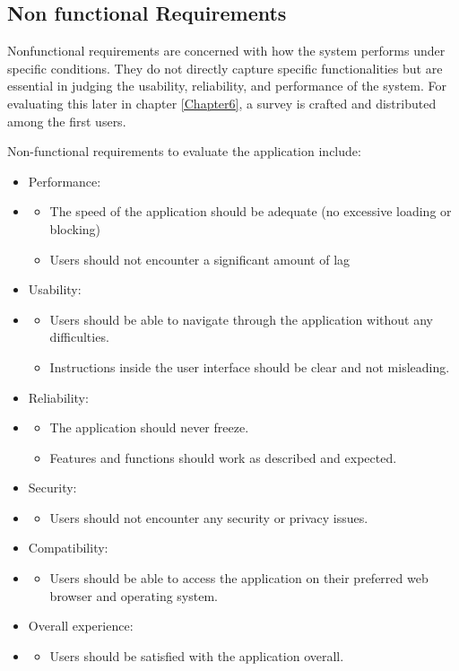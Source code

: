 \subsection{Non functional Requirements}

Nonfunctional requirements are concerned with how the system performs under specific conditions. 
They do not directly capture specific functionalities but are essential in 
judging the usability, reliability, and performance of the system. 
For evaluating this later in chapter \ref{Chapter6}, a survey is crafted and distributed among the first users. 

Non-functional requirements to evaluate the application include:

\begin{itemize}
    \item Performance:
    \item \begin{itemize}
        \item The speed of the application should be adequate (no excessive loading or blocking)
        \item Users should not encounter a significant amount of lag
    \end{itemize}
    \item Usability:
    \item \begin{itemize}
        \item Users should be able to navigate through the application without any difficulties.
        \item Instructions inside the user interface should be clear and not misleading.
    \end{itemize}
    \item Reliability:
    \item \begin{itemize}
        \item The application should never freeze.
        \item Features and functions should work as described and expected.
    \end{itemize}
    \item Security:
    \item \begin{itemize}
        \item Users should not encounter any security or privacy issues.
    \end{itemize}
    \item Compatibility:
    \item \begin{itemize}
        \item Users should be able to access the application on their preferred web browser and operating system.
    \end{itemize}
    \item Overall experience:
    \item \begin{itemize}
        \item Users should be satisfied with the application overall.
    \end{itemize}
\end{itemize}


